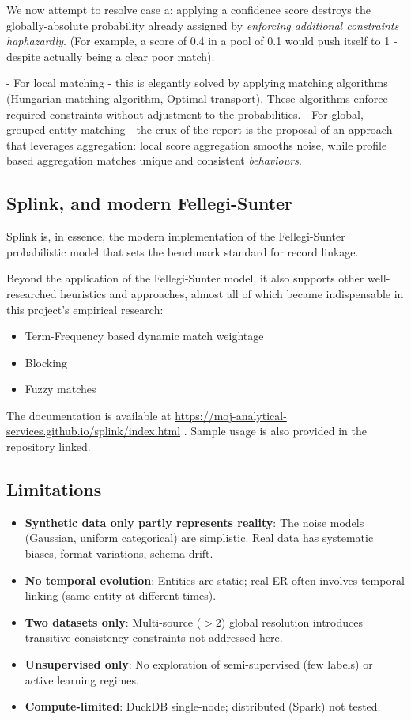 We now attempt to resolve case a: applying a confidence score destroys the globally-absolute probability already assigned by \textit{enforcing additional constraints haphazardly}. (For example, a score of 0.4 in a pool of 0.1 would push itself to 1 - despite actually being a clear poor match).

- For local matching - this is elegantly solved by applying matching algorithms (Hungarian matching algorithm, Optimal transport). These algorithms enforce required constraints without adjustment to the probabilities.
- For global, grouped entity matching - the crux of the report is the proposal of an approach that leverages aggregation: local score aggregation smooths noise, while profile based aggregation matches unique and consistent \textit{behaviours}.

\subsection{Splink, and modern Fellegi-Sunter}
\label{subsec:splink}
Splink is, in essence, the modern implementation of the Fellegi-Sunter probabilistic model that sets the benchmark standard for record linkage.

Beyond the application of the Fellegi-Sunter model, it also supports other well-researched heuristics and approaches, almost all of which became indispensable in this project’s empirical research:
\begin{itemize}
  \item Term-Frequency based dynamic match weightage
  \item Blocking
  \item Fuzzy matches
\end{itemize}
The documentation is available at \url{https://moj-analytical-services.github.io/splink/index.html} \citep{splink2024}. Sample usage is also provided in the repository linked.

\subsection{Limitations}
\label{sec:limitations}
\begin{itemize}
  \item \textbf{Synthetic data only partly represents reality}: The noise models (Gaussian, uniform categorical) are simplistic. Real data has systematic biases, format variations, schema drift.
  \item \textbf{No temporal evolution}: Entities are static; real ER often involves temporal linking (same entity at different times).
  \item \textbf{Two datasets only}: Multi-source ($>2$) global resolution introduces transitive consistency constraints not addressed here.
  \item \textbf{Unsupervised only}: No exploration of semi-supervised (few labels) or active learning regimes.
  \item \textbf{Compute-limited}: DuckDB single-node; distributed \splink{} (Spark) not tested.
\end{itemize}
